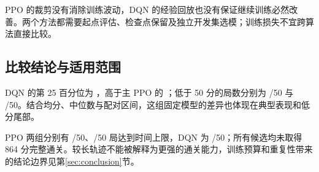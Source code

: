 PPO 的裁剪没有消除训练波动，DQN 的经验回放也没有保证继续训练必然改善。两个方法都需要起点评估、检查点保留及独立开发集选模；训练损失不宜跨算法直接比较。

\subsection{比较结论与适用范围}
DQN 的第 25 百分位为 \DQNPxxv，高于主 PPO 的 \PPOControlPxxv；低于 50 分的局数分别为 \DQNLow/50 与 \PPOControlLow/50。结合均分、中位数与配对区间，这组固定模型的差异也体现在典型表现和低分尾部。

PPO 两组分别有 \PPOControlTimeout/50、\PPOGaeTimeout/50 局达到时间上限，DQN 为 \DQNTimeout/50；所有候选均未取得 864 分完整通关。较长轨迹不能被解释为更强的通关能力，训练预算和重复性带来的结论边界见第\ref{sec:conclusion}节。

\FloatBarrier
